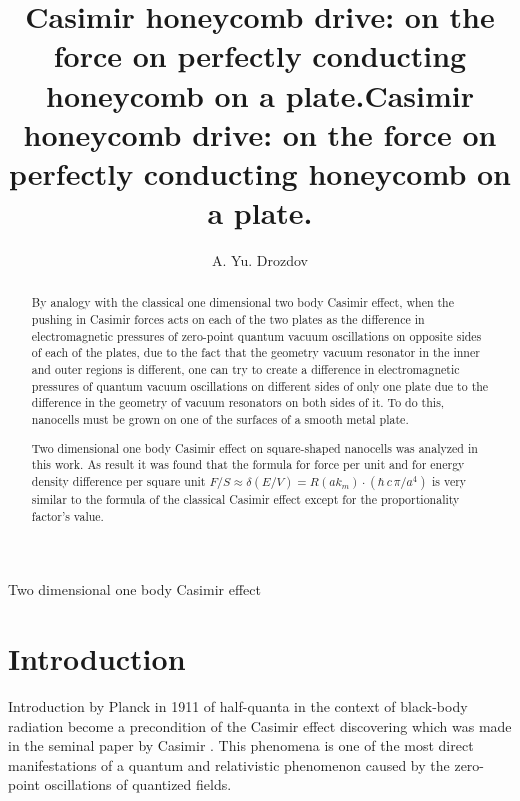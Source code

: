 \documentclass[11pt]{article}
\author{A. Yu. Drozdov}
\title{Casimir honeycomb drive: on the force on perfectly conducting honeycomb on a plate.}
\begin{document}
    
    \maketitle
    
    

    
    \title{Casimir honeycomb drive: on the force on perfectly conducting honeycomb on a plate.}

    \begin{abstract}

By analogy with the classical one dimensional two body Casimir effect, when the pushing in Casimir forces acts on each of the two plates as the difference in electromagnetic pressures of zero-point quantum vacuum oscillations on opposite sides of each of the plates, due to the fact that the geometry vacuum resonator in the inner and outer regions is different, one can try to create a difference in electromagnetic pressures of quantum vacuum oscillations on different sides of only one plate due to the difference in the geometry of vacuum resonators on both sides of it. To do this, nanocells must be grown on one of the surfaces of a smooth metal plate.

Two dimensional one body Casimir effect on square-shaped nanocells was analyzed in this work. As result it was found that the formula for force per unit and for energy density difference per square unit $F/S \approx \delta\left(E/V\right) = R\left(a k_m\right)\cdot\left(\hbar\,c\,\pi/{a^4}\right)$ is very similar to the formula of the classical Casimir effect except for the proportionality factor's value.

\end{abstract}

    \begin{keywords}
Two dimensional one body Casimir effect
\end{keywords}

    \section{Introduction}\label{introduction}

Introduction by Planck in 1911 of half-quanta in the context of
black-body radiation become a precondition of the Casimir effect
discovering which was made in the seminal paper by Casimir
\cite{Casimir1948}. This phenomena is one of the most direct
manifestations of a quantum and relativistic phenomenon caused by the
zero-point oscillations of quantized fields.
\end{document}
